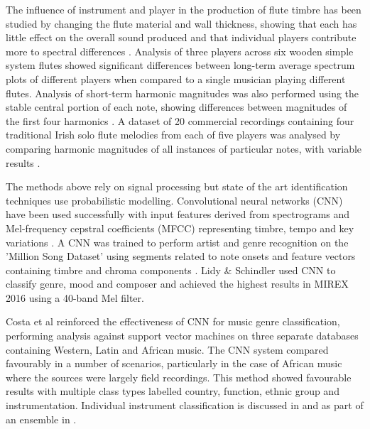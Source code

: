 \documentclass{article}
\begin{document}
{The influence of instrument and player in the production of flute timbre has been studied by changing the flute material and wall thickness, showing that each has little effect on the overall sound produced and that individual players contribute more to spectral differences \cite{backus_effect_1964, coltman_effect_1971, widholm_silver_2001}. Analysis of three players across six wooden simple system flutes showed significant differences between long-term average spectrum plots of different players when compared to a single musician playing different flutes. Analysis of short-term harmonic magnitudes was also performed using the stable central portion of each note, showing differences between magnitudes of the first four harmonics \cite{ali-maclachlan_quantifying_2013}. A dataset of 20 commercial recordings containing four traditional Irish solo flute melodies from each of five players was analysed by comparing harmonic magnitudes of all instances of particular notes, with variable results \cite{ali-maclachlan_towards_2015}. %

The methods above rely on signal processing but state of the art identification techniques use probabilistic modelling. Convolutional neural networks (CNN) have been used successfully with input features derived from spectrograms \cite{lee_unsupervised_2009} and Mel-frequency cepstral coefficients (MFCC) representing timbre, tempo and key variations \cite{li_automatic_2010}. A CNN was trained to perform artist and genre recognition on the 'Million Song Dataset' \cite{bertin-mahieux_million_2011} using segments related to note onsets and feature vectors containing timbre and chroma components \cite{dieleman_audio-based_2011}. Lidy \& Schindler \cite{lidy_parallel_2016} used CNN to classify genre, mood and composer and achieved the highest results in MIREX 2016 using a 40-band Mel filter.

Costa et al \cite{costa_evaluation_2017} reinforced the effectiveness of CNN for music genre classification, performing analysis against support vector machines on three separate databases containing Western, Latin and African music. The CNN system compared favourably in a number of scenarios, particularly in the case of African music where the sources were largely field recordings. This method showed favourable results with multiple class types labelled country, function, ethnic group and instrumentation. Individual instrument classification is discussed in \cite{park_musical_2015} and as part of an ensemble in \cite{han_deep_2017}.

}
\end{document}
